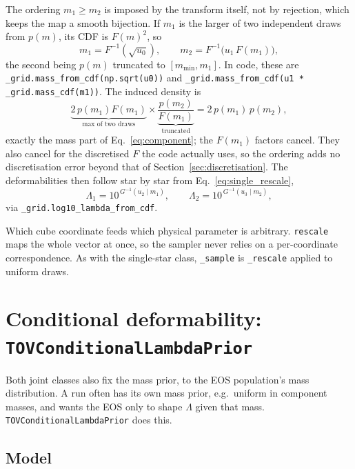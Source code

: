 \documentclass[11pt,a4paper]{article}
\newcommand{\code}[1]{\texttt{#1}}
\begin{document}
The ordering $m_1 \ge m_2$ is imposed by the transform itself, not by rejection,
which keeps the map a smooth bijection. If $m_1$ is the larger of two
independent draws from $p(m)$, its CDF is $F(m)^2$, so
\begin{equation}
  m_1 = F^{-1}\!\left( \sqrt{u_0} \right),
  \qquad
  m_2 = F^{-1}\!\big( u_1\, F(m_1) \big),
  \label{eq:ordered}
\end{equation}
the second being $p(m)$ truncated to $[m_{\min}, m_1]$. In code, these are
\code{\_grid.mass\_from\_cdf(np.sqrt(u0))} and
\code{\_grid.mass\_from\_cdf(u1 * \_grid.mass\_cdf(m1))}. The induced density is
\begin{equation}
  \underbrace{2\, p(m_1) F(m_1)}_{\text{max of two draws}} \times
  \underbrace{\frac{p(m_2)}{F(m_1)}}_{\text{truncated}}
  = 2\, p(m_1)\, p(m_2),
\end{equation}
exactly the mass part of Eq.~\eqref{eq:component}; the $F(m_1)$ factors cancel.
They also cancel for the discretised $F$ the code actually uses, so the
ordering adds no discretisation error beyond that of
Section~\ref{sec:discretisation}. The deformabilities then follow
star by star from Eq.~\eqref{eq:single_rescale},
\begin{equation}
  \Lambda_1 = 10^{\,G^{-1}(u_2 \mid m_1)},
  \qquad
  \Lambda_2 = 10^{\,G^{-1}(u_3 \mid m_2)},
\end{equation}
via \code{\_grid.log10\_lambda\_from\_cdf}.

Which cube coordinate feeds which physical parameter is arbitrary.
\code{rescale} maps the whole vector at once, so the sampler never relies on a
per-coordinate correspondence. As with the single-star class, \code{\_sample}
is \code{\_rescale} applied to uniform draws.

\section{Conditional deformability: \code{TOVConditionalLambdaPrior}}
\label{sec:conditional}

Both joint classes also fix the mass prior, to the EOS population's mass
distribution. A run often has its own mass prior, e.g.\ uniform in component
masses, and wants the EOS only to shape $\Lambda$ given that mass.
\code{TOVConditionalLambdaPrior} does this.

\subsection{Model}
\end{document}
